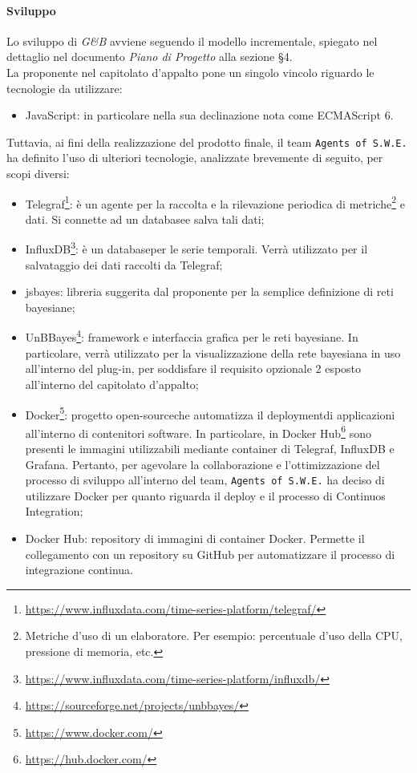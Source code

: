 \paragraph{Sviluppo}\label{Progettazione_Sviluppo}
Lo sviluppo di \textit{G\&B} avviene seguendo il modello incrementale, spiegato nel dettaglio nel documento \textit{Piano di Progetto} alla sezione §4.\\
La proponente nel capitolato d'appalto pone un singolo vincolo riguardo le tecnologie da utilizzare:
\begin{itemize}
	\item JavaScript: in particolare nella sua declinazione nota come ECMAScript 6\glossario.
\end{itemize}
Tuttavia, ai fini della realizzazione del prodotto finale, il team \texttt{Agents of S.W.E.} ha definito l'uso di ulteriori tecnologie, analizzate brevemente di seguito, per scopi diversi:
\begin{itemize} 
	\item Telegraf\glossario\footnote{\url{https://www.influxdata.com/time-series-platform/telegraf/}}: è un agente per la raccolta e la rilevazione periodica di metriche\footnote{Metriche d'uso di un elaboratore. Per esempio: percentuale d'uso della CPU, pressione di memoria, etc.} e dati. Si connette ad un database\glossario e salva tali dati;
	\item InfluxDB\glossario\footnote{\url{https://www.influxdata.com/time-series-platform/influxdb/}}: è un database\glossario per le serie temporali. Verrà utilizzato per il salvataggio dei dati raccolti da Telegraf;
	\item jsbayes\glossario: libreria suggerita dal proponente per la semplice definizione di reti bayesiane; 
	\item UnBBayes\glossario\footnote{\url{https://sourceforge.net/projects/unbbayes/}}: framework e interfaccia grafica per le reti bayesiane. In particolare, verrà utilizzato per la visualizzazione della rete bayesiana in uso all'interno del plug-in, per soddisfare il requisito opzionale 2 esposto all'interno del capitolato d'appalto;
	\item Docker\glossario\footnote{\url{https://www.docker.com/}}: progetto open-source\glossario che automatizza il deployment\glossario di applicazioni all'interno di contenitori software. In particolare, in Docker Hub\glossario\footnote{\url{https://hub.docker.com/}} sono presenti le immagini utilizzabili mediante container di Telegraf, InfluxDB e Grafana. Pertanto, per agevolare la collaborazione e l'ottimizzazione del processo di sviluppo all'interno del team, \texttt{Agents of S.W.E.} ha deciso di utilizzare Docker per quanto riguarda il deploy e il processo di Continuos Integration;
	\item Docker Hub\glossario: repository di immagini di container Docker. Permette il collegamento con un repository su GitHub per automatizzare il processo di integrazione continua.
\end{itemize}

